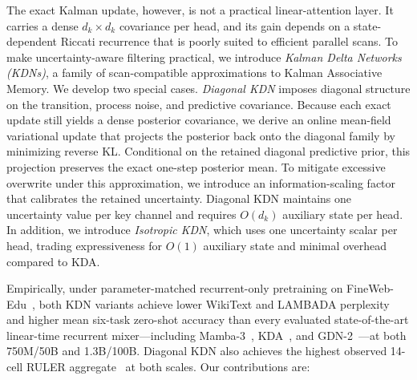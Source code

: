 \documentclass{article} %
\begin{document}
The exact Kalman update, however, is not a practical linear-attention layer. It
carries a dense $d_k\times d_k$ covariance per head, and its gain depends on a state-dependent
Riccati recurrence that is poorly suited to efficient parallel scans. To make uncertainty-aware
filtering practical, we introduce \emph{Kalman Delta Networks (KDNs)}, a family of scan-compatible
approximations to Kalman Associative Memory. We develop two special cases. \emph{Diagonal KDN}
imposes diagonal structure on the transition, process noise, and predictive covariance. Because
each exact update still yields a dense posterior covariance, we derive an online mean-field
variational update that projects the posterior back onto the diagonal family by minimizing reverse
KL. Conditional on the retained diagonal predictive prior, this projection preserves the exact
one-step posterior mean. To mitigate excessive overwrite under this approximation, we introduce an
information-scaling factor that calibrates the retained uncertainty. Diagonal KDN maintains one
uncertainty value per key channel and requires $O(d_k)$ auxiliary state per head.
In addition, we introduce \emph{Isotropic KDN}, which uses one uncertainty scalar per head,
trading expressiveness for $O(1)$ auxiliary state and minimal overhead compared to KDA.

Empirically, under parameter-matched recurrent-only pretraining on
FineWeb-Edu~\citep{penedo2024fineweb}, both KDN variants achieve lower WikiText and LAMBADA
perplexity and higher mean six-task zero-shot accuracy than every evaluated state-of-the-art
linear-time recurrent mixer---including Mamba-3~\citep{lahoti2026mamba3},
KDA~\citep{kimiteam2025kimilinear}, and GDN-2~\citep{hatamizadeh2026gdn2}---at both 750M/50B
and 1.3B/100B. Diagonal KDN also achieves the highest observed 14-cell RULER
aggregate~\citep{hsieh2024ruler} at both scales. Our contributions are:
\end{document}
